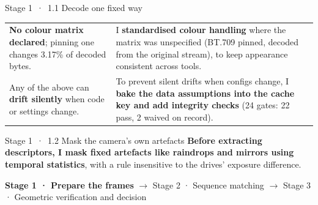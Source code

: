 \documentclass[10pt,aspectratio=169]{beamer}
\begin{document}
\begin{frame}{Stage 1 \,·\, 1.1 Decode one fixed way}
\begin{tabularx}{\textwidth}{@{}>{\raggedright\arraybackslash}p{}>{\raggedright\arraybackslash}X@{}}
\addlinespace[3pt]
\textbf{No colour matrix declared}; pinning one changes 3.17\% of decoded bytes. & I \textbf{standardised colour handling} where the matrix was unspecified (BT.709 pinned, decoded from the original stream), to keep appearance consistent across tools. \\
\addlinespace[3pt]
Any of the above can \textbf{drift silently} when code or settings change. & To prevent silent drifts when configs change, I \textbf{bake the data assumptions into the cache key and add integrity checks} (24 gates: 22 pass, 2 waived on record). \\
\bottomrule\end{tabularx}
\end{frame}

\begin{frame}{Stage 1 \,·\, 1.2 Mask the camera's own artefacts}
\vspace{-5pt}
{\footnotesize \textbf{Before extracting descriptors, I mask fixed artefacts like raindrops and mirrors using temporal statistics}, with a rule insensitive to the drives' exposure difference.}
\vspace{-6pt}
\begin{center}\end{center}
\vspace{-9pt}\begin{center}\tiny \textbf{Stage 1 · Prepare the frames} $\rightarrow$ \textcolor{navy!55}{Stage 2 · Sequence matching} $\rightarrow$ \textcolor{navy!55}{Stage 3 · Geometric verification and decision}\end{center}

\end{frame}
\end{document}
